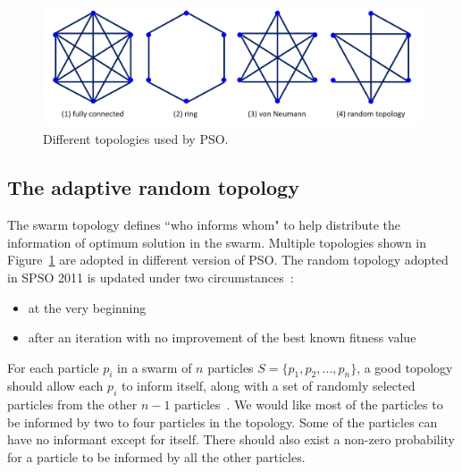\begin{figure}[!t] \centering
\includegraphics[width=\textwidth]{SPSO_topology}
\caption{Different topologies used by PSO.}\label{fig:SPSO_topology}
\end{figure} 


\subsection{The adaptive random topology} 
The swarm topology defines ``who informs whom" to help distribute the information of optimum solution in the swarm.
Multiple topologies shown in Figure~\ref{fig:SPSO_topology} are adopted in different version of PSO.
The random topology adopted in SPSO 2011 is updated under two circumstances~\cite{Clerc:2012:SPSO2011}:
\begin{itemize}
\item at the very beginning
\item after an iteration with no improvement of the best known fitness value
\end{itemize}

For each particle $p_i$ in a swarm of $n$ particles $S = \{ p_1, p_2, ..., p_n \}$, 
a good topology should allow each $p_i$ to inform itself, 
along with a set of randomly selected particles from the other $n-1$ particles~\cite{Clerc:2007:randomTopology}.
We would like most of the particles to be informed by two to four particles in the topology.
Some of the particles can have no informant except for itself.
There should also exist a non-zero probability for a particle to be informed by all the other particles.

